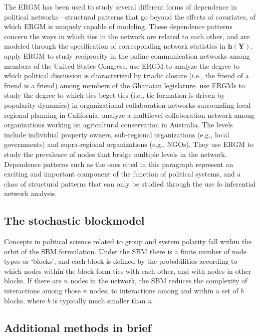 \documentclass[fleqn,12pt]{wlscirep}
\newcommand{\bh}{\bm{h}}
\begin{document}
The ERGM has been used to study several different forms of dependence in political networks---structural patterns that go beyond the effects of covariates, of which ERGM is uniquely capable of modeling. These dependence patterns concern the ways in which ties in the network are related to each other, and are modeled through the specification of corresponding network statistics in $ \bh(\bm{Y})$. \cite{peng2016follower} apply ERGM to study reciprocity in the online communication networks among members of the United States Congress. \cite{osei2018party} use ERGM to analyze the degree to which political discussion is characterized by triadic closure (i.e., the friend of a friend is a friend) among members of the Ghanaian legislature. \cite{gerber2013political} use ERGMs to study the degree to which ties beget ties (i.e., tie formation is driven by popularity dynamics) in organizational collaboration networks surrounding local regional planning in California. \cite{guerrero2015achieving} analyze a multilevel collaboration network among organizations working on agricultural conservation in Australia.  The levels include individual property owners, sub-regional organizations (e.g., local governments) and supra-regional organizations (e.g., NGOs). They use ERGM to study the prevalence of nodes that bridge multiple levels in the network. Dependence patterns such as the ones cited in this paragraph represent an exciting and important component of the function of political systems, and a class of structural patterns that can only be studied through the use fo inferential network analysis.


\subsection{The stochastic blockmodel}

Concepts in political science related to group  and system polarity \citep[e.g., ][]{baldassarri2007dynamics,cranmer2015kantian} fall within the orbit of the SBM formulation. Under the SBM there is a finite number of node types or `blocks', and each block is defined by the probabilities according to which nodes within the block form ties with each other, and with nodes in other blocks. If there are $n$ nodes in the network, the SBM reduces the complexity of interactions among those $n$  nodes, to interactions among and within a set of $b$ blocks, where $b$ is typically much smaller than $n$. 

\subsection{Additional methods in brief}
\end{document}
